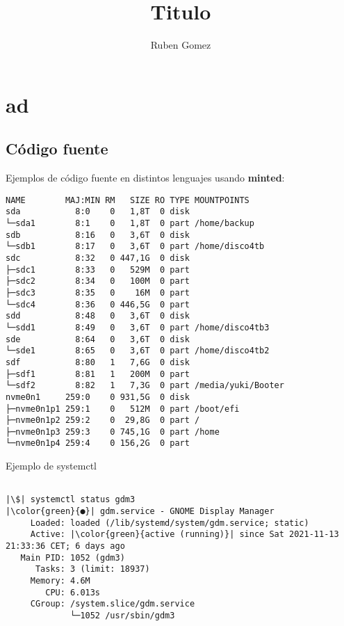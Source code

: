 \documentclass[12pt,a4paper,openany]{book}
\author{Ruben Gomez}
\title{Titulo}
\begin{document}
\maketitle

\tableofcontents

\part{ad}


\chapter{Código fuente}
Ejemplos de código fuente en distintos lenguajes usando \textbf{minted}:

\begin{verbatim}
NAME        MAJ:MIN RM   SIZE RO TYPE MOUNTPOINTS
sda           8:0    0   1,8T  0 disk 
└─sda1        8:1    0   1,8T  0 part /home/backup
sdb           8:16   0   3,6T  0 disk 
└─sdb1        8:17   0   3,6T  0 part /home/disco4tb
sdc           8:32   0 447,1G  0 disk 
├─sdc1        8:33   0   529M  0 part 
├─sdc2        8:34   0   100M  0 part 
├─sdc3        8:35   0    16M  0 part 
└─sdc4        8:36   0 446,5G  0 part 
sdd           8:48   0   3,6T  0 disk 
└─sdd1        8:49   0   3,6T  0 part /home/disco4tb3
sde           8:64   0   3,6T  0 disk 
└─sde1        8:65   0   3,6T  0 part /home/disco4tb2
sdf           8:80   1   7,6G  0 disk 
├─sdf1        8:81   1   200M  0 part 
└─sdf2        8:82   1   7,3G  0 part /media/yuki/Booter
nvme0n1     259:0    0 931,5G  0 disk 
├─nvme0n1p1 259:1    0   512M  0 part /boot/efi
├─nvme0n1p2 259:2    0  29,8G  0 part /
├─nvme0n1p3 259:3    0 745,1G  0 part /home
└─nvme0n1p4 259:4    0 156,2G  0 part 

\end{verbatim}



Ejemplo de systemctl
\begin{verbatim}

|\$| systemctl status gdm3 
|\color{green}{●}| gdm.service - GNOME Display Manager
     Loaded: loaded (/lib/systemd/system/gdm.service; static)
     Active: |\color{green}{active (running)}| since Sat 2021-11-13 21:33:36 CET; 6 days ago
   Main PID: 1052 (gdm3)
      Tasks: 3 (limit: 18937)
     Memory: 4.6M
        CPU: 6.013s
     CGroup: /system.slice/gdm.service
             └─1052 /usr/sbin/gdm3

\end{verbatim}
\end{document}
